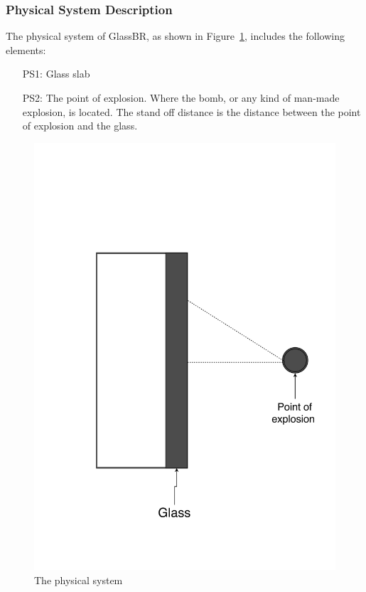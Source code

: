 \documentclass[12pt]{article}
\begin{document}
\subsubsection{Physical System Description}
\label{Sec:PhysSystDesc}
The physical system of GlassBR, as shown in Figure~\ref{Figure:Thephyssyst}, includes the following elements:
\begin{itemize}
\item[PS1:]Glass slab
\item[PS2:]The point of explosion. Where the bomb, or any kind of man-made explosion, is located. The stand off distance is the distance between the point of explosion and the glass.
\end{itemize}
\begin{figure}
\begin{center}
\includegraphics[width=\textwidth]{../../../datafiles/GlassBR/physicalsystimage.png}
\caption{The physical system}
\label{Figure:Thephyssyst}
\end{center}
\end{figure}
\end{document}
